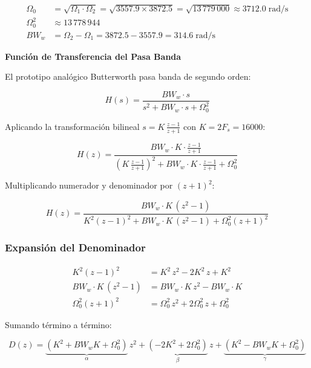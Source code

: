 \begin{align}
    \Omega_0 &= \sqrt{\Omega_1 \cdot \Omega_2} = \sqrt{3557.9 \times 3872.5} = \sqrt{13\,779\,000} \approx 3712.0 \;\text{rad/s} \\[6pt]
    \Omega_0^2 &\approx 13\,778\,944 \\[6pt]
    BW_w &= \Omega_2 - \Omega_1 = 3872.5 - 3557.9 = 314.6 \;\text{rad/s}
\end{align}

\textbf{Función de Transferencia del Pasa Banda}

El prototipo analógico Butterworth pasa banda de segundo orden:

\begin{equation}
    H(s) = \frac{BW_w \cdot s}{s^2 + BW_w \cdot s + \Omega_0^2}
\end{equation}

Aplicando la transformación bilineal $s = K\,\frac{z-1}{z+1}$ con $K = 2F_s = 16000$:

\begin{equation}
    H(z) = \frac{BW_w \cdot K \cdot \frac{z-1}{z+1}}{\left(K\,\frac{z-1}{z+1}\right)^{\!2} + BW_w \cdot K \cdot \frac{z-1}{z+1} + \Omega_0^2}
\end{equation}

Multiplicando numerador y denominador por $(z+1)^2$:

\begin{equation}
    H(z) = \frac{BW_w \cdot K\,(z^2 - 1)}{K^2(z-1)^2 + BW_w \cdot K\,(z^2-1) + \Omega_0^2(z+1)^2}
\end{equation}

\subsubsection{Expansión del Denominador}

\begin{align}
    K^2(z-1)^2 &= K^2\,z^2 - 2K^2\,z + K^2 \\
    BW_w \cdot K\,(z^2-1) &= BW_w \cdot K\,z^2 - BW_w \cdot K \\
    \Omega_0^2(z+1)^2 &= \Omega_0^2\,z^2 + 2\Omega_0^2\,z + \Omega_0^2
\end{align}

Sumando término a término:

\begin{equation}
    D(z) = \underbrace{(K^2 + BW_w K + \Omega_0^2)}_{\alpha}\,z^2 + \underbrace{(-2K^2 + 2\Omega_0^2)}_{\beta}\,z + \underbrace{(K^2 - BW_w K + \Omega_0^2)}_{\gamma}
\end{equation}


